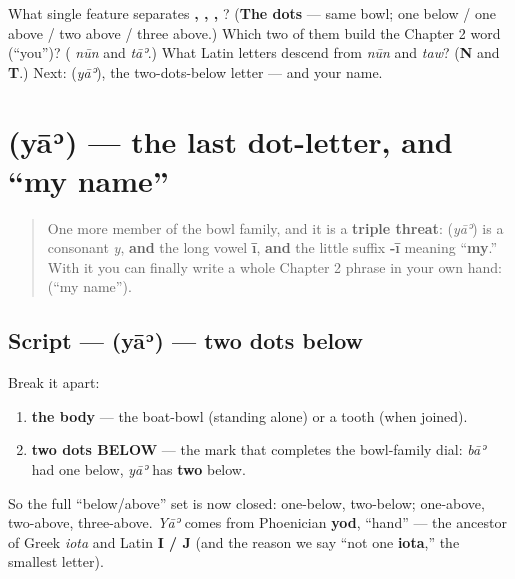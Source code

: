\begin{tcolorbox}[breakable,colback=teal!4,colframe=teal!35!black,title={Before you move on}]
What single feature separates \textbf{, , , }? (\textbf{The dots} — same bowl; one below / one above / two above / three above.) Which two of them build the Chapter 2 word \textbf{} (\textquotedblleft{}you\textquotedblright{})? (\textbf{} \emph{nūn} and \textbf{} \emph{tāʾ}.) What Latin letters descend from \emph{nūn} and \emph{taw}? (\textbf{N} and \textbf{T}.) Next: \textbf{} (\emph{yāʾ}), the two-dots-below letter — and your name.
\end{tcolorbox}
\section[\texorpdfstring{\ar{ي} (yāʾ)}{ي (yāʾ)}]{ (yāʾ) — the last dot-letter, and \textquotedblleft{}my name\textquotedblright{}}

\label{lesson:AR-W05-ya-and-my-name}



\begin{quote}
One more member of the bowl family, and it is a \textbf{triple threat}: \textbf{} (\emph{yāʾ}) is a consonant \emph{y}, \textbf{and} the long vowel \textbf{ī}, \textbf{and} the little suffix \textbf{-ī} meaning \textquotedblleft{}\textbf{my}.\textquotedblright{} With it you can finally write a whole Chapter 2 phrase in your own hand: \textbf{} (\textquotedblleft{}my name\textquotedblright{}).
\end{quote}

\subsection*{Script —  (yāʾ) — two dots below}

Break it apart:

\begin{enumerate}
\raggedright
  \item \textbf{the body} — the boat-bowl (standing alone) or a tooth (when joined).
  \item \textbf{two dots BELOW} — the mark that completes the bowl-family dial: \emph{bāʾ} had one below, \emph{yāʾ} has \textbf{two} below.
\end{enumerate}

So the full \textquotedblleft{}below/above\textquotedblright{} set is now closed: \textbf{} one-below, \textbf{} two-below; \textbf{} one-above, \textbf{} two-above, \textbf{} three-above. \emph{Yāʾ} comes from Phoenician \textbf{yod}, \textquotedblleft{}hand\textquotedblright{} — the ancestor of Greek \emph{iota} and Latin \textbf{I / J} (and the reason we say \textquotedblleft{}not one \textbf{iota},\textquotedblright{} the smallest letter).

